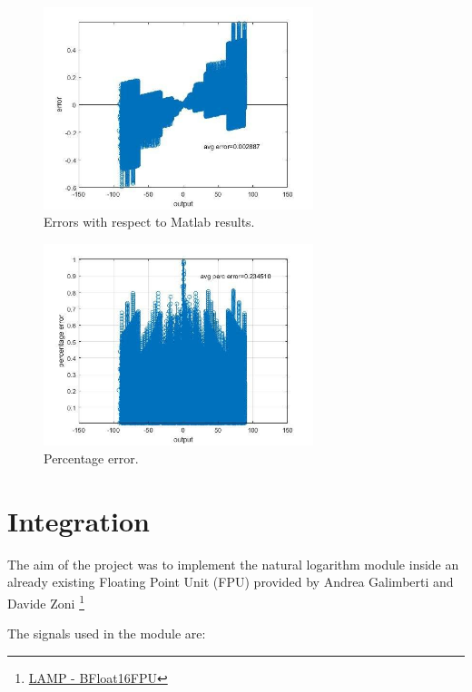 \documentclass{report}
\begin{document}
\begin{figure}[ht]
  \centering
    \includegraphics[width=0.7\textwidth]{images/avg_err.jpg}
    \caption{Errors with respect to Matlab results.}
\end{figure}

\begin{figure}[]
  \centering
    \includegraphics[width=0.7\textwidth]{images/avg_perc_err.png}
    \caption{Percentage error.}
\end{figure}
\chapter{Integration}
The aim of the project was to implement the natural logarithm module inside an already existing Floating Point Unit (FPU) provided by  Andrea Galimberti and Davide Zoni 
\footnote{\href{https://gitlab.com/davide.zoni/bfloat_fpu_systemverilog} {LAMP - BFloat16FPU} }

The signals used in the module are:
\end{document}
